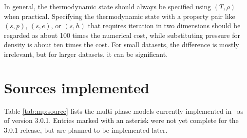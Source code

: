 In general, the thermodynamic state should always be specified using $(T,\rho)$ when practical.  Specifying the thermodynamic state with a property pair like $(s,p)$, $(s,e)$, or $(s,h)$ that requires iteration in two dimensions should be regarded as about 100 times the numerical cost, while substituting pressure for density is about ten times the cost.  For small datasets, the difference is mostly irrelevant, but for larger datasets, it can be significant.

\section{Sources implemented}
Table \ref{tab:mp:source} lists the multi-phase models currently implemented in \PM\ as of version 3.0.1.  Entries marked with an asterisk were not yet complete for the 3.0.1 release, but are planned to be implemented later.

